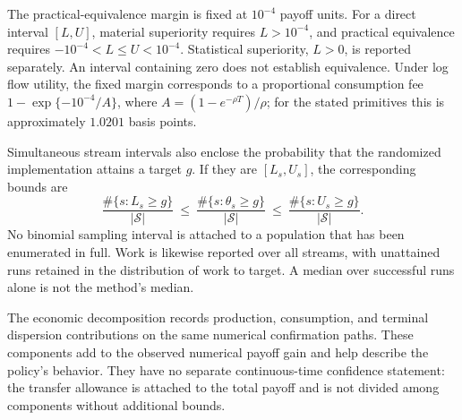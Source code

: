 The practical-equivalence margin is fixed at $10^{-4}$ payoff units. For a
direct interval $[L,U]$, material superiority requires $L>10^{-4}$, and
practical equivalence requires $-10^{-4}<L\le U<10^{-4}$. Statistical
superiority, $L>0$, is reported separately. An interval containing zero does
not establish equivalence. Under log flow utility, the fixed margin corresponds
to a proportional consumption fee
$1-\exp\{-10^{-4}/A\}$, where
$A=(1-e^{-\rho T})/\rho$; for the stated primitives this is approximately
$1.0201$ basis points.

Simultaneous stream intervals also enclose the probability that the
randomized implementation attains a target $g$. If they are $[L_s,U_s]$,
the corresponding bounds are
\begin{equation}
 \frac{\#\{s:L_s\ge g\}}{|\mathcal S|}
 \ \le\ \frac{\#\{s:\theta_s\ge g\}}{|\mathcal S|}
 \ \le\ \frac{\#\{s:U_s\ge g\}}{|\mathcal S|}.
 \label{eq:r15attainment}
\end{equation}
No binomial sampling interval is attached to a population that has been
enumerated in full. Work is likewise reported over all streams, with
unattained runs retained in the distribution of work to target. A median over
successful runs alone is not the method's median.

The economic decomposition records production, consumption, and terminal
dispersion contributions on the same numerical confirmation paths. These
components add to the observed numerical payoff gain and help describe the
policy's behavior. They have no separate continuous-time confidence statement:
the transfer allowance is attached to the total payoff and is not divided
among components without additional bounds.
